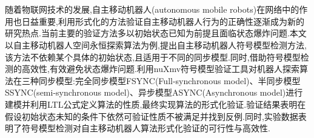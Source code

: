 \vspace{-2.5cm}
\chapter*{}
\vspace{-1cm}

随着物联网技术的发展,自主移动机器人(autonomous mobile robots)在网络中的作用也日益重要,利用形式化的方法验证自主移动机器人行为的正确性逐渐成为新的研究热点.当前主要的验证方法多以初始状态已知为前提且面临状态爆炸问题.本文以自主移动机器人空间永恒探索算法为例,提出自主移动机器人符号模型检测方法,该方法不依赖某个具体的初始状态,且适用于不同的同步模型.同时,借助符号模型检测的高效性,有效避免状态爆炸问题.利用nuXmv符号模型验证工具对机器人探索算法在三种同步模型:完全同步模型FSYNC(Full-synchronous model)、半同步模型SSYNC(semi-synchronous model)、异步模型ASYNC(Asynchronous model)进行建模并利用LTL公式定义算法的性质,最终实现算法的形式化验证.验证结果表明在假设初始状态未知的条件下依然可验证性质不被满足并找到反例.同时,实验数据表明了符号模型检测对自主移动机器人算法形式化验证的可行性与高效性.


\hspace{-0.5cm}
 
